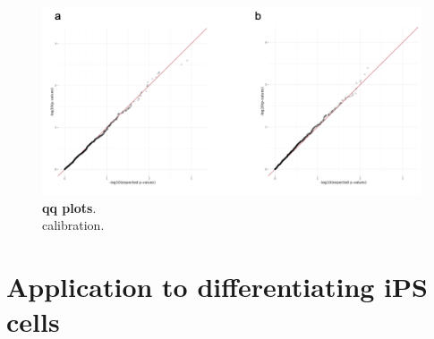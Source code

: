 \begin{figure}[h]
\centering
\includegraphics[width=15.5cm]{Chapter6/Fig/sc_structlmm_calibration.png}
\caption[qq plots]{\textbf{qq plots}.\\
calibration.}
\label{fig:sc_structlmm_calibration}
\end{figure}





\clearpage

\section{Application to differentiating iPS cells}

